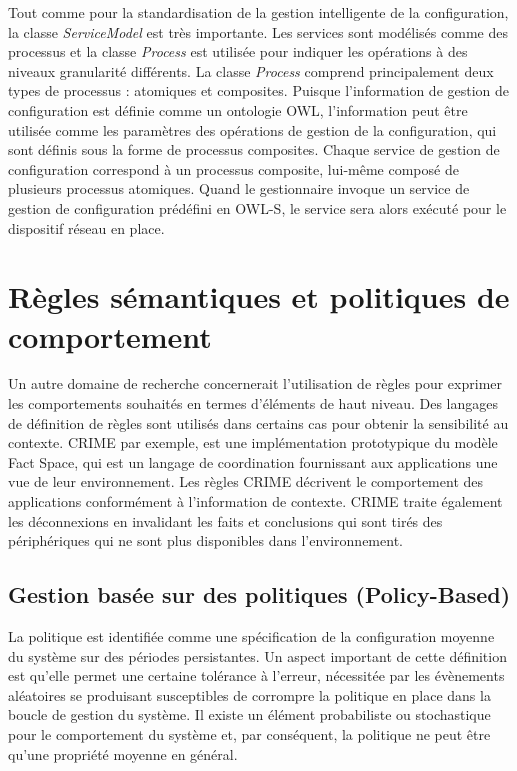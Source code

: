 Tout comme pour la standardisation de la gestion intelligente de la
configuration, la classe \emph{ServiceModel} est très importante. Les services
sont modélisés comme des processus et la classe \emph{Process} est utilisée pour
indiquer les opérations à des niveaux granularité différents. La classe
\emph{Process} comprend principalement deux types de processus : atomiques et
composites. Puisque l'information de gestion de configuration est définie comme
un ontologie OWL, l'information peut être utilisée comme les paramètres des
opérations de gestion de la configuration, qui sont définis sous la forme de
processus composites.  Chaque service de gestion de configuration correspond à
un processus composite, lui-même composé de plusieurs processus atomiques. Quand
le gestionnaire invoque un service de gestion de configuration prédéfini en
OWL-S, le service sera alors exécuté pour le dispositif réseau en place.

\section{Règles sémantiques et politiques de comportement}

Un autre domaine de recherche concernerait l'utilisation de règles pour exprimer
les comportements souhaités en termes d'éléments de haut niveau. Des langages
de définition de règles sont utilisés dans certains cas pour obtenir la
sensibilité au contexte. CRIME \cite{murphy_coordination_2007} par exemple, est
une implémentation prototypique du modèle Fact Space, qui est un langage de
coordination fournissant aux applications une vue de leur environnement. Les
règles CRIME décrivent le comportement des applications conformément à
l'information de contexte. CRIME traite également les déconnexions en invalidant
les faits et conclusions qui sont tirés des périphériques qui ne sont plus
disponibles dans l'environnement.

\subsection{Gestion basée sur des politiques (Policy-Based)}

La politique est identifiée comme une spécification de la configuration moyenne
du système sur des périodes persistantes. Un aspect important de cette
définition est qu'elle permet une certaine tolérance à l'erreur, nécessitée par
les évènements aléatoires se produisant susceptibles de corrompre la politique
en place dans la boucle de gestion du système. Il existe un élément probabiliste
ou stochastique pour le comportement du système et, par conséquent, la politique
ne peut être qu'une propriété moyenne en général.

